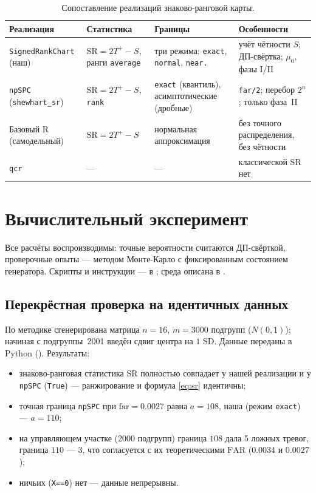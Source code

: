 \documentclass[11pt,a4paper]{article}
\newcommand{\SR}{\mathrm{SR}}
\newcommand{\FAR}{\mathrm{FAR}}
\newcommand{\far}{\mathrm{far}}
\begin{document}
\begin{table}[htbp]\centering
\caption{Сопоставление реализаций знаково-ранговой карты.}
\label{tab:compare}
\footnotesize
\begin{tabular}{@{}p{2.7cm} p{3.4cm} p{3.7cm} p{4.2cm}@{}}
\toprule
Реализация & Статистика & Границы & Особенности \\
\midrule
\texttt{SignedRankChart} (наш) & $\SR=2T^+-S$, ранги \texttt{average} &
три режима: \texttt{exact}, \texttt{normal}, \texttt{near.} &
учёт чётности $S$; ДП-свёртка; $\mu_0$, фазы I/II \\
\texttt{npSPC} (\texttt{shewhart\_sr}) & $\SR=2T^+-S$, \texttt{rank} &
\texttt{exact} (квантиль), асимптотические (дробные) &
\texttt{far/2}; перебор $2^n$; только фаза~II \\
Базовый R (самодельный) & $\SR=2T^+-S$ & нормальная аппроксимация &
без точного распределения, без чётности \\
\texttt{qcr} & --- & --- & классической SR нет \\
\bottomrule
\end{tabular}
\normalsize
\end{table}

\section{Вычислительный эксперимент}
\label{sec:exp}

Все расчёты воспроизводимы: точные вероятности считаются ДП-свёрткой,
проверочные опыты --- методом Монте-Карло с фиксированным состоянием
генератора. Скрипты и инструкции --- в ;
среда описана в .

\subsection{Перекрёстная проверка на идентичных данных}
\label{sec:cross}

По методике  сгенерирована матрица
$n=16$, $m=3000$ подгрупп ($N(0,1)$); начиная с подгруппы~2001 введён
сдвиг центра на $1$ SD. Данные переданы в Python
(). Результаты:
\begin{itemize}
\item знаково-ранговая статистика $\SR$ полностью совпадает у нашей
реализации и у \texttt{npSPC} (\texttt{True}) --- ранжирование и формула
\eqref{eq:sr} идентичны;
\item точная граница \texttt{npSPC} при $\far=0.0027$ равна $a=108$, наша
(режим \texttt{exact}) --- $a=110$;
\item на управляющем участке (2000 подгрупп) граница $108$ дала 5 ложных
тревог, граница $110$ --- 3, что согласуется с их теоретическими $\FAR$
($0.0034$ и $0.0027$);
\item ничьих (\texttt{X==0}) нет --- данные непрерывны.
\end{itemize}
\end{document}
